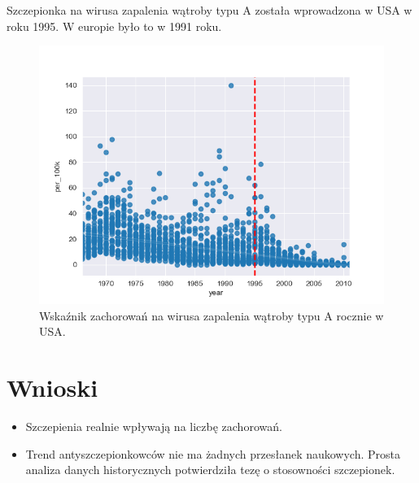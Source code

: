 \documentclass{classrep}
\begin{document}
    Szczepionka na wirusa zapalenia wątroby typu A została wprowadzona w USA w roku 1995. W europie było to w 1991 roku.
    \begin{figure}[H]
        \centering
        \includegraphics[width=1\textwidth]{images/images1/Figure_6.png}
        \caption{Wskaźnik zachorowań na wirusa zapalenia wątroby typu A rocznie w USA.}
        \label{fig6}
    \end{figure}

\section{Wnioski}

    \begin{itemize}
        \item Szczepienia realnie wpływają na liczbę zachorowań.
        \item Trend antyszczepionkowców nie ma żadnych przesłanek naukowych. Prosta analiza danych historycznych potwierdziła tezę o stosowności szczepionek.
    \end{itemize}


\nocite{*}
    
    
\end{document}
